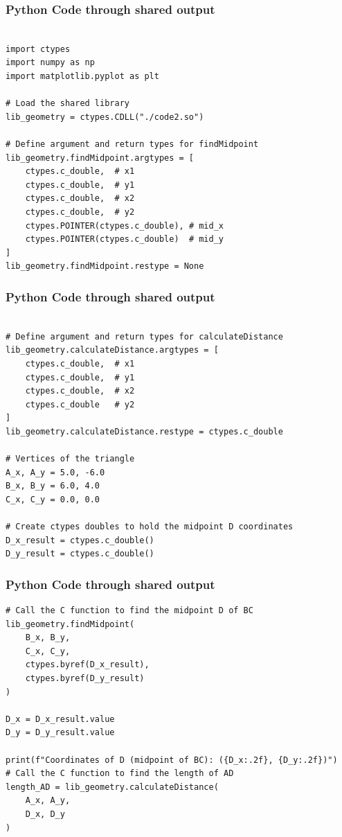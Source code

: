 \documentclass{beamer}
\begin{document}
\begin{frame}[fragile]
\frametitle{Python Code through shared output }

\begin{lstlisting}

import ctypes
import numpy as np
import matplotlib.pyplot as plt

# Load the shared library
lib_geometry = ctypes.CDLL("./code2.so")

# Define argument and return types for findMidpoint
lib_geometry.findMidpoint.argtypes = [
    ctypes.c_double,  # x1
    ctypes.c_double,  # y1
    ctypes.c_double,  # x2
    ctypes.c_double,  # y2
    ctypes.POINTER(ctypes.c_double), # mid_x
    ctypes.POINTER(ctypes.c_double)  # mid_y
]
lib_geometry.findMidpoint.restype = None

\end{lstlisting}
    \end{frame}
    \begin{frame}[fragile]
\frametitle{Python Code through shared output }

\begin{lstlisting}

# Define argument and return types for calculateDistance
lib_geometry.calculateDistance.argtypes = [
    ctypes.c_double,  # x1
    ctypes.c_double,  # y1
    ctypes.c_double,  # x2
    ctypes.c_double   # y2
]
lib_geometry.calculateDistance.restype = ctypes.c_double

# Vertices of the triangle
A_x, A_y = 5.0, -6.0
B_x, B_y = 6.0, 4.0
C_x, C_y = 0.0, 0.0

# Create ctypes doubles to hold the midpoint D coordinates
D_x_result = ctypes.c_double()
D_y_result = ctypes.c_double()
\end{lstlisting}
    \end{frame}
    \begin{frame}[fragile]
\frametitle{Python Code through shared output }

\begin{lstlisting}
# Call the C function to find the midpoint D of BC
lib_geometry.findMidpoint(
    B_x, B_y,
    C_x, C_y,
    ctypes.byref(D_x_result),
    ctypes.byref(D_y_result)
)

D_x = D_x_result.value
D_y = D_y_result.value

print(f"Coordinates of D (midpoint of BC): ({D_x:.2f}, {D_y:.2f})")
# Call the C function to find the length of AD
length_AD = lib_geometry.calculateDistance(
    A_x, A_y,
    D_x, D_y
)
\end{lstlisting}
    \end{frame}
\end{document}
